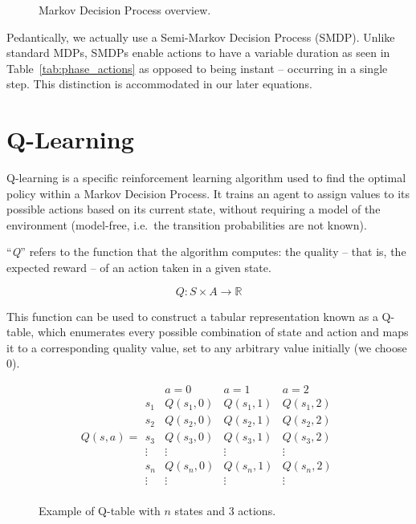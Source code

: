 \documentclass[a4paper]{report}
\begin{document}
\begin{figure}[H]
  \centering
  \caption{Markov Decision Process overview.}
  \label{fig:markov_decision_process}
\end{figure}

Pedantically, we actually use a Semi-Markov Decision Process (SMDP). Unlike standard MDPs, SMDPs enable actions to have a variable duration as seen in Table~\ref{tab:phase_actions} as opposed to being instant -- occurring in a single step. This distinction is accommodated in our later equations.

\section{Q-Learning}

Q-learning is a specific reinforcement learning algorithm used to find the optimal policy within a Markov Decision Process. It trains an agent to assign values to its possible actions based on its current state, without requiring a model of the environment (model-free, i.e.\ the transition probabilities are not known).

``\emph{Q}'' refers to the function that the algorithm computes: the quality -- that is, the expected reward -- of an action taken in a given state.

\[
Q: S \times A \to \mathbb{R}
\]

This function can be used to construct a tabular representation known as a Q-table, which enumerates every possible combination of state and action and maps it to a corresponding quality value, set to any arbitrary value initially (we choose 0).

\begin{figure}[H]
  \centering
  \[
  Q(s, a) =
  \begin{array}{c|ccc}
    \text{} & a=0 & a=1 & a=2 \\
    \hline
    s_1 & Q(s_1,0) & Q(s_1,1) & Q(s_1,2) \\
    s_2 & Q(s_2,0) & Q(s_2,1) & Q(s_2,2) \\
    s_3 & Q(s_3,0) & Q(s_3,1) & Q(s_3,2) \\
    \vdots & \vdots & \vdots & \vdots \\
    s_n & Q(s_n,0) & Q(s_n,1) & Q(s_n,2) \\
    \vdots & \vdots & \vdots & \vdots \\
  
  \end{array}
  \]
  \caption{Example of Q-table with $n$ states and 3 actions.}
  \label{arr:q_table_example}
\end{figure}
\end{document}
